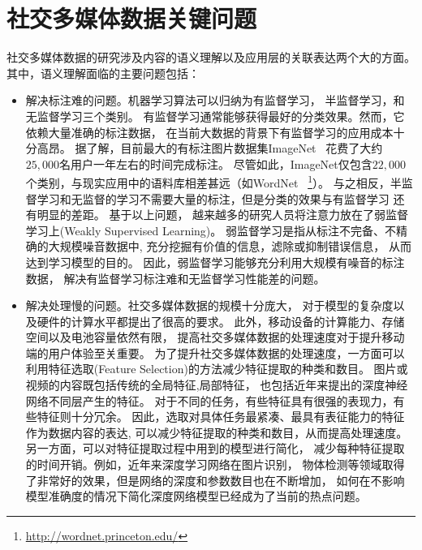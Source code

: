 \section{社交多媒体数据关键问题}
\label{sec:key_problems}
社交多媒体数据的研究涉及内容的语义理解以及应用层的关联表达两个大的方面。
其中，语义理解面临的主要问题包括：
\begin{itemize}
    \item 解决标注难的问题。机器学习算法可以归纳为有监督学习，
        半监督学习，和无监督学习三个类别。
        有监督学习通常能够获得最好的分类效果。然而，它依赖大量准确的标注数据，
        在当前大数据的背景下有监督学习的应用成本十分高昂。
        据了解，目前最大的有标注图片数据集ImageNet~\cite{russakovsky2015imagenet}
        花费了大约$25,000$名用户一年左右的时间完成标注。
        尽管如此，ImageNet仅包含$22,000$个类别，与现实应用中的语料库相差甚远（如WordNet
        ~\footnote{\url{http://wordnet.princeton.edu/}}）。
        与之相反，半监督学习和无监督的学习不需要大量的标注，但是分类的效果与有监督学习
        还有明显的差距。 基于以上问题，
        越来越多的研究人员将注意力放在了弱监督学习上(Weakly Supervised
        Learning)。
        弱监督学习是指从标注不完备、不精确的大规模噪音数据中,
        充分挖掘有价值的信息，滤除或抑制错误信息，
        从而达到学习模型的目的。
        因此，弱监督学习能够充分利用大规模有噪音的标注数据，
        解决有监督学习标注难和无监督学习性能差的问题。

    \item 解决处理慢的问题。社交多媒体数据的规模十分庞大，
        对于模型的复杂度以及硬件的计算水平都提出了很高的要求。
        此外，移动设备的计算能力、存储空间以及电池容量依然有限，
        提高社交多媒体数据的处理速度对于提升移动端的用户体验至关重要。
        为了提升社交多媒体数据的处理速度，一方面可以利用特征选取(Feature
        Selection)的方法减少特征提取的种类和数目。
        图片或视频的内容既包括传统的全局特征,局部特征，
        也包括近年来提出的深度神经网络不同层产生的特征。
        对于不同的任务，有些特征具有很强的表现力，有些特征则十分冗余。
        因此，选取对具体任务最紧凑、最具有表征能力的特征作为数据内容的表达,
        可以减少特征提取的种类和数目，从而提高处理速度。
        另一方面，可以对特征提取过程中用到的模型进行简化，
        减少每种特征提取的时间开销。例如，近年来深度学习网络在图片识别，
        物体检测等领域取得了非常好的效果，但是网络的深度和参数数目也在不断增加，
        如何在不影响模型准确度的情况下简化深度网络模型已经成为了当前的热点问题。
\end{itemize}

